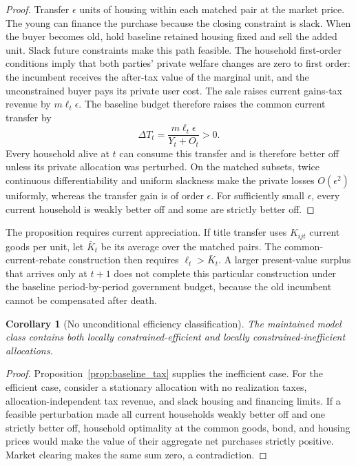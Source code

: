 \documentclass[11pt]{article}
\newtheorem{corollary}{Corollary}
\begin{document}
\begin{proof}
Transfer $\epsilon$ units of housing within each matched pair at the market
price.  The young can finance the purchase because the closing constraint is
slack.  When the buyer becomes old, hold baseline retained housing fixed and
sell the added unit.  Slack future constraints make this path feasible.  The
household first-order conditions imply that both parties' private welfare
changes are zero to first order: the incumbent receives the after-tax value of
the marginal unit, and the unconstrained buyer pays its private user cost.  The
sale raises current gains-tax revenue by $m\ell_t\epsilon$.  The baseline
budget therefore raises the common current transfer by
\[
 \Delta T_t=\frac{m\ell_t\epsilon}{Y_t+O_t}>0.
\]
Every household alive at $t$ can consume this transfer and is therefore better
off unless its private allocation was perturbed.  On the matched subsets,
twice continuous differentiability and uniform slackness make the private
losses $O(\epsilon^2)$ uniformly, whereas the transfer gain is of order
$\epsilon$.  For sufficiently small $\epsilon$, every current household is
weakly better off and some are strictly better off.
\end{proof}

The proposition requires current appreciation.  If title transfer uses
$K_{ijt}$ current goods per unit, let $\bar K_t$ be its average over the matched
pairs.  The common-current-rebate construction then requires
$\ell_t>\bar K_t$.  A larger present-value surplus that arrives only at $t+1$
does not complete this particular construction under the baseline
period-by-period government budget, because the old incumbent cannot be
compensated after death.

\begin{corollary}[No unconditional efficiency classification]
The maintained model class contains both locally constrained-efficient and
locally constrained-inefficient allocations.
\end{corollary}

\begin{proof}
Proposition~\ref{prop:baseline_tax} supplies the inefficient case.  For the
efficient case, consider a stationary allocation with no realization taxes,
allocation-independent tax revenue, and slack housing and financing limits.
If a feasible perturbation made all current households weakly better off and
one strictly better off, household optimality at the common goods, bond, and
housing prices would make the value of their aggregate net purchases strictly
positive.  Market clearing makes the same sum zero, a contradiction.
\end{proof}
\end{document}
